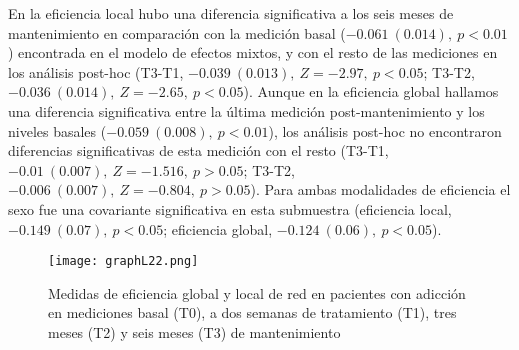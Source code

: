 En la eficiencia local hubo una diferencia significativa a los seis meses de mantenimiento en comparación con la medición basal ($-0.061\ (0.014),\ p<0.01$) encontrada en el modelo de efectos mixtos, y con el resto de las mediciones en los análisis post-hoc (T3-T1, $-0.039\ (0.013),\ Z=-2.97,\ p<0.05$; T3-T2, $-0.036\ (0.014),\ Z=-2.65,\ p<0.05$). Aunque en la eficiencia global hallamos una diferencia significativa entre la última medición post-mantenimiento y los niveles basales ($-0.059\ (0.008),\ p<0.01$), los análisis post-hoc no encontraron diferencias significativas de esta medición con el resto (T3-T1, $-0.01\ (0.007),\ Z=-1.516,\ p>0.05$; T3-T2, $-0.006\ (0.007),\ Z=-0.804,\ p>0.05$). Para ambas modalidades de eficiencia el sexo fue una covariante significativa en esta submuestra (eficiencia local, $-0.149\ (0.07),\ p<0.05$; eficiencia global, $-0.124\ (0.06),\ p<0.05$).

\begin{figure}[!htb]
    \centering
    \texttt{[image: graphL22.png]}
    \caption{Medidas de eficiencia global y local de red en pacientes con adicción en mediciones basal (T0), a dos semanas de tratamiento (T1), tres meses (T2) y seis meses (T3) de mantenimiento}
    \label{fig:gpL22}
\end{figure}

